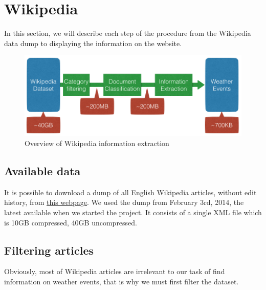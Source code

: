 

%
\section{Wikipedia}
In this section, we will describe each step of the procedure from the Wikipedia data dump to displaying the information on the website.
\begin{figure}[H]
    \includegraphics[width=\textwidth]{figures/wiki-flow.png}
    \caption{Overview of Wikipedia information extraction}
     \label{fig:wikiflow}
\end{figure}
\subsection{Available data}
It is possible to download a dump of all English Wikipedia articles, without edit history, from \href{https://meta.wikimedia.org/wiki/Data_dump_torrents#enwiki}{this webpage}. We used the dump from February 3rd, 2014, the latest available when we started the project. It consists of a single XML file which is 10GB compressed, 40GB uncompressed. 
\subsection{Filtering articles}
Obviously, most of Wikipedia articles are irrelevant to our task of find information on weather events, that is why we must first filter the dataset. 
